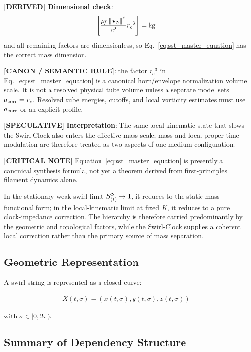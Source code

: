 \documentclass[11pt]{article}
\theoremstyle{definition}
\theoremstyle{plain}
\theoremstyle{remark}
\newcommand{\swirlarrow}{\mathchoice{\mkern-2mu\scriptstyle\boldsymbol{\circlearrowleft}}{\mkern-2mu\scriptstyle\boldsymbol{\circlearrowleft}}{\mkern-2mu\scriptscriptstyle\boldsymbol{\circlearrowleft}}{\mkern-2mu\scriptscriptstyle\boldsymbol{\circlearrowleft}}}
\newcommand{\vswirl}{\mathbf{v}_{\swirlarrow}}
\newcommand{\rhoF}{{\rho_{\!f}}}
\newcommand{\SwirlClock}{{S_{(t)}^{\swirlarrow}}}
\newcommand{\rc}{{r_c}}
\begin{document}
        \textbf{[DERIVED] Dimensional check}:
        \begin{align}
            \left[ \frac{\rhoF\,\norm{\vswirl}^2}{c^2} \rc^3 \right] = \mathrm{kg}
        \end{align}
        and all remaining factors are dimensionless, so Eq.~\ref{eq:sst_master_equation} has the correct mass dimension.

        \textbf{[CANON / SEMANTIC RULE]}: the factor \(\rc^3\) in Eq.~\eqref{eq:sst_master_equation} is a canonical horn/envelope normalization volume scale. It is not a resolved physical tube volume unless a separate model sets \(a_{\rm core}=\rc\). Resolved tube energies, cutoffs, and local vorticity estimates must use \(a_{\rm core}\) or an explicit profile.

        \textbf{[SPECULATIVE] Interpretation}: The same local kinematic state that slows the Swirl-Clock also enters the effective mass scale; mass and local proper-time modulation are therefore treated as two aspects of one medium configuration.

        \textbf{[CRITICAL NOTE]} Equation~\eqref{eq:sst_master_equation} is presently a canonical synthesis formula, not yet a theorem derived from first-principles filament dynamics alone.

        In the stationary weak-swirl limit $\SwirlClock \to 1$, it reduces to the static mass-functional form; in the local-kinematic limit at fixed $K$, it reduces to a pure clock-impedance correction. The hierarchy is therefore carried predominantly by the geometric and topological factors, while the Swirl-Clock supplies a coherent local correction rather than the primary source of mass separation.

    \subsection{Geometric Representation}
        
        A swirl-string is represented as a closed curve:
        
        \begin{align}
            X(t,\sigma) = (x(t,\sigma), y(t,\sigma), z(t,\sigma))
        \end{align}
        
        with $\sigma \in [0,2\pi)$.
    
    \subsection{Summary of Dependency Structure}
        
\end{document}
